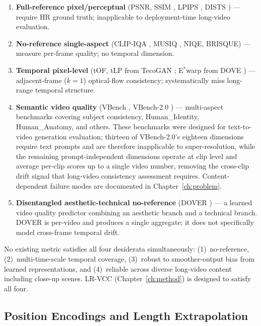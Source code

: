 \begin{enumerate}
    \item \textbf{Full-reference pixel/perceptual} (PSNR, SSIM \cite{wang_ssim_2004},
          LPIPS \cite{zhang_lpips_2018}, DISTS \cite{ding_dists_2020}) --- require HR
          ground truth; inapplicable to deployment-time long-video evaluation.
    \item \textbf{No-reference single-aspect} (CLIP-IQA \cite{wang_clipiqa_2023}, MUSIQ
          \cite{ke_musiq_2021}, NIQE, BRISQUE) --- measure per-frame quality; no temporal
          dimension.
    \item \textbf{Temporal pixel-level} (tOF, tLP from TecoGAN \cite{chu_tecogan_2020};
          E$^*$warp from DOVE \cite{yang_dove_2024}) --- adjacent-frame ($k{=}1$)
          optical-flow consistency; systematically miss long-range temporal structure.
    \item \textbf{Semantic video quality} (VBench \cite{huang_vbench_2024}, VBench-2.0
          \cite{huang_vbench2_2025}) --- multi-aspect benchmarks covering subject
          consistency, Human\_Identity, Human\_Anatomy, and others. These benchmarks were
          designed for text-to-video generation evaluation; thirteen of VBench-2.0's
          eighteen dimensions require text prompts and are therefore inapplicable to
          super-resolution, while the remaining prompt-independent dimensions operate at
          clip level and average per-clip scores up to a single video number, removing
          the cross-clip drift signal that long-video consistency assessment requires.
          Content-dependent failure modes are documented in Chapter~\ref{ch:problem}.
    \item \textbf{Disentangled aesthetic-technical no-reference} (DOVER
          \cite{wu_dover_2023}) --- a learned video quality predictor combining an
          aesthetic branch and a technical branch. DOVER is per-video and produces a
          single aggregate; it does not specifically model cross-frame temporal drift.
\end{enumerate}

No existing metric satisfies all four desiderata simultaneously: (1)~no-reference,
(2)~multi-time-scale temporal coverage, (3)~robust to smoother-output bias from learned
representations, and (4)~reliable across diverse long-video content including close-up
scenes. LR-VCC (Chapter~\ref{ch:method}) is designed to satisfy all four.

\subsection{Position Encodings and Length Extrapolation}
\label{sec:related:rope}

